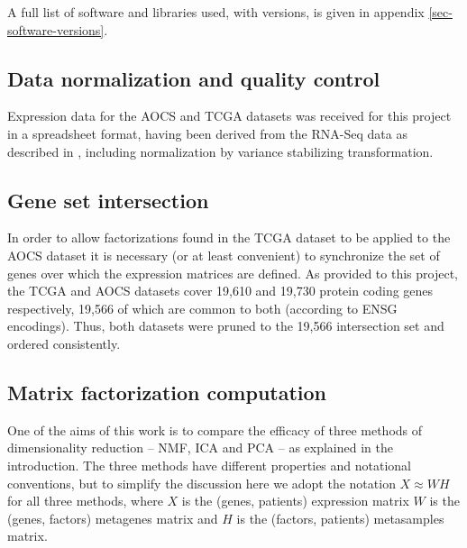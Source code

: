 \documentclass[draft, tikz, 12pt,a4paper,oneside,fleqn]{article}
\begin{document}
A full list of software and libraries used, with versions, is given in appendix \ref{sec-software-versions}.

\subsection{Data normalization and quality control}

Expression data for the AOCS and TCGA datasets was received for this project in a spreadsheet format, having been derived from the RNA-Seq data as described in \cite{Ewing2020}, including  normalization by variance stabilizing transformation.   

\subsection{Gene set intersection}
\label{sec:gene-set-intersection}

In order to allow factorizations found in the TCGA dataset to be applied to the AOCS dataset it is necessary (or at least convenient) to synchronize the set of genes over which the expression matrices are defined.   As provided to this project, the TCGA and AOCS datasets cover 19,610 and 19,730 protein coding genes respectively, 19,566 of which are common to both (according to ENSG encodings).  Thus, both datasets were pruned to the 19,566 intersection set and ordered consistently.

\subsection{Matrix factorization computation}
One of the aims of this work is to compare the efficacy of three methods of dimensionality reduction -- NMF, ICA and PCA -- as explained in the introduction.   The three methods have different properties and notational conventions, but to simplify the discussion here we adopt the notation $X \approx W H$ for all three methods, where $X$ is the (genes, patients) expression matrix  $W$ is the (genes, factors) metagenes matrix and $H$ is the (factors, patients) metasamples matrix.   
\end{document}
